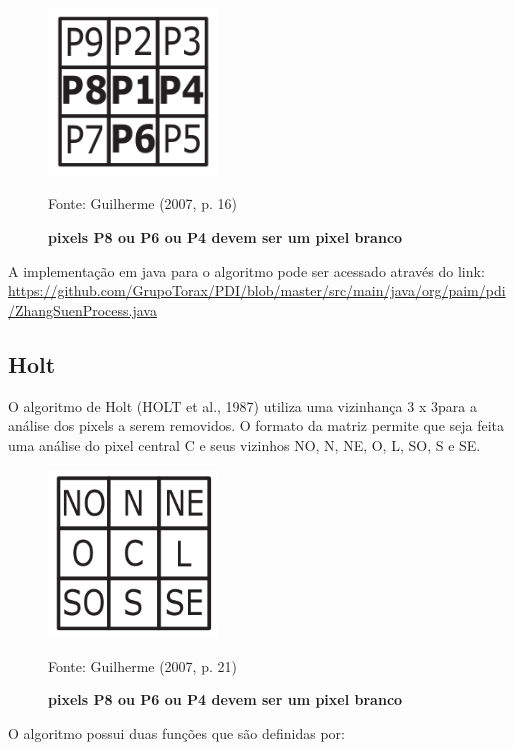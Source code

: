 \documentclass[
	12pt,				%
	oneside,			%
	a4paper,			%
	english,			%
	french,				%
	spanish,			%
	brazil,				%
	]{abntex2}
\begin{document}
\begin{figure}[ht]
\centering
\caption{\textbf{pixels P8 ou P6 ou P4 devem ser um pixel branco}}
\includegraphics[width=0.4\textwidth]{imagens/zhangsuen4.png}

Fonte: Guilherme (2007, p. 16)
\label{fig:zhangsuen4}
\end{figure}

A implementação em java para o algoritmo pode ser acessado através do link:
\url{https://github.com/GrupoTorax/PDI/blob/master/src/main/java/org/paim/pdi/ZhangSuenProcess.java}

\subsection{Holt}    

O algoritmo de Holt (HOLT et al., 1987) utiliza uma vizinhança 3 x 3para a análise dos pixels a serem removidos. O formato da matriz permite que seja feita uma análise do pixel central C e seus vizinhos NO, N, NE, O, L, SO, S e SE.

\begin{figure}[ht]
\centering
\caption{\textbf{pixels P8 ou P6 ou P4 devem ser um pixel branco}}
\includegraphics[width=0.4\textwidth]{imagens/holt.png}

Fonte: Guilherme (2007, p. 21)
\label{fig:holt}
\end{figure}

O algoritmo possui duas funções que são definidas por:
\end{document}
